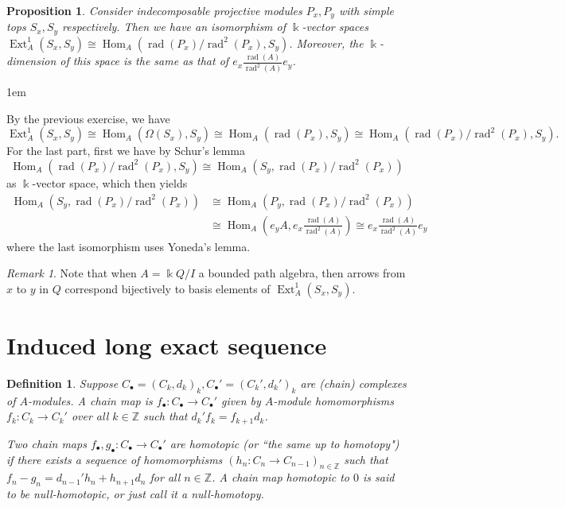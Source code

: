 \documentclass[11pt,a4paper]{article}
\makeatletter
\numberwithin{equation}{section}
\renewenvironment{proof}[1][\proofname]{\par
    \pushQED{\qed}%
    \normalfont \topsep0\p@\@plus6\p@ \labelsep1em\relax
    \trivlist
    \item[\hskip\labelsep\indent
        \bfseries #1]\ignorespaces
    \mbox{}
}{
    \popQED\endtrivlist\@endpefalse
}
\theoremstyle{all}
\newtheorem{proposition}[theorem]{Proposition}
\newtheorem{definition}[theorem]{Definition}
\theoremstyle{remark}
\newtheorem{remark}[theorem]{Remark}
\newcommand{\Z}{\mathbb{Z}}
\newcommand{\rad}{\operatorname{rad}\nolimits}
\newcommand{\Ext}{\operatorname{Ext}\nolimits}
\newcommand{\Hom}{\operatorname{Hom}\nolimits}
\newcommand{\defn}[1]{\textsl{\color{darkblue} #1}}
\makeatother
\begin{document}
\begin{proposition}\label{prop:ext simple}
Consider indecomposable projective modules $P_x, P_y$ with simple tops $S_x, S_y$ respectively.
Then we have an isomorphism of $\Bbbk$-vector spaces $\Ext_A^1(S_x,S_y)\cong \Hom_A(\rad(P_x)/\rad^2(P_x), S_y)$.
Moreover, the $\Bbbk$-dimension of this space is the same as that of $e_x\frac{\rad(A)}{\rad^2(A)}e_y$.
\end{proposition}
\begin{proof}
By the previous exercise, we have \[
\Ext_A^1(S_x,S_y)\cong \Hom_A(\Omega(S_x),S_y)\cong \Hom_A(\rad(P_x),S_y) \cong \Hom_A(\rad(P_x)/\rad^2(P_x), S_y).\]
For the last part, first we have by Schur's lemma 
\[\Hom_A(\rad(P_x)/\rad^2(P_x), S_y)\cong \Hom_A(S_y,\rad(P_x)/\rad^2(P_x))\] as $\Bbbk$-vector space, which then yields
\begin{align*}
\Hom_A(S_y,\rad(P_x)/\rad^2(P_x)) & \cong \Hom_A(P_y,\rad(P_x)/\rad^2(P_x)) \\
&\cong \Hom_A(e_yA, e_x\frac{\rad(A)}{\rad^2(A)}) \cong e_x\frac{\rad(A)}{\rad^2(A)}e_y
\end{align*}
where the last isomorphism uses Yoneda's lemma.
\end{proof}
\begin{remark}
Note that when $A=\Bbbk Q/I$ a bounded path algebra, then arrows from $x$ to $y$ in $Q$ correspond bijectively to basis elements of $\Ext^1_A(S_x,S_y)$.
\end{remark}

\section{Induced long exact sequence}



\begin{definition}
Suppose $C_\bullet=(C_k,d_k)_k, C_\bullet'=(C_k',d_k')_k$ are (chain) complexes of $A$-modules.
A \defn{chain map} is $f_\bullet:C_\bullet\to C_\bullet'$ given by $A$-module homomorphisms $f_k:C_k\to C_k'$ over all $k\in\Z$ such that $d_k'f_k=f_{k+1}d_k$.

Two chain maps $f_\bullet, g_\bullet: C_\bullet\to C_\bullet'$ are \defn{homotopic} (or ``the same up to homotopy") if there exists a sequence of homomorphisms $(h_n:C_{n}\to C_{n-1})_{n\in \Z}$ such that $f_n-g_n = d_{n-1}'h_n+h_{n+1}d_n$ for all $n\in \Z$.
A chain map homotopic to $0$ is said to be \defn{null-homotopic}, or just call it a \defn{null-homotopy}.
\end{definition}
\end{document}
